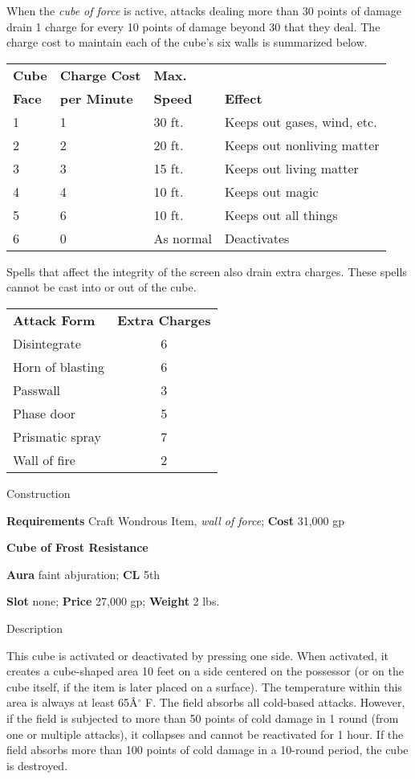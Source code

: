 When the \textit{cube of force }is active, attacks dealing more than 30 points of damage drain 1 charge for every 10 points of damage beyond 30 that they deal. The charge cost to maintain each of the cube's six walls is summarized below.\\

\begin{tabularx}{\linewidth}{lllX}
\textbf{Cube} & \textbf{Charge Cost} & \textbf{Max.} & \\
\textbf{Face} & \textbf{per Minute} & \textbf{Speed} & \textbf{Effect}\\
1 & 1 & 30 ft. & Keeps out gases, wind, etc.\\
2 & 2 & 20 ft. & Keeps out nonliving matter\\
3 & 3 & 15 ft. & Keeps out living matter\\
4 & 4 & 10 ft. & Keeps out magic\\
5 & 6 & 10 ft. & Keeps out all things\\
6 & 0 & As normal & Deactivates\\
\end{tabularx}
				
Spells that affect the integrity of the screen also drain extra charges. These spells cannot be cast into or out of the cube. \\

\begin{tabular}{lc}
\textbf{Attack Form} & \textbf{Extra Charges}\\
Disintegrate & 6\\
Horn of blasting & 6\\
Passwall & 3\\
Phase door & 5\\
Prismatic spray & 7 \\
Wall of fire & 2\\
\end{tabular}
				
Construction
				
\textbf{Requirements} Craft Wondrous Item, \textit{wall of force}; \textbf{Cost }31,000 gp
				
\textbf{Cube of Frost Resistance}
				
\textbf{Aura} faint abjuration;\textbf{ CL }5th
				
\textbf{Slot} none; \textbf{Price} 27,000 gp; \textbf{Weight }2 lbs.
				
Description
				
This cube is activated or deactivated by pressing one side. When activated, it creates a cube-shaped area 10 feet on a side centered on the possessor (or on the cube itself, if the item is later placed on a surface)\textit{. }The temperature within this area is always at least 65\^A\mbox{${}^\circ$} F. The field absorbs all cold-based attacks. However, if the field is subjected to more than 50 points of cold damage in 1 round (from one or multiple attacks), it collapses and cannot be reactivated for 1 hour. If the field absorbs more than 100 points of cold damage in a 10-round period, the cube is destroyed. 
				
